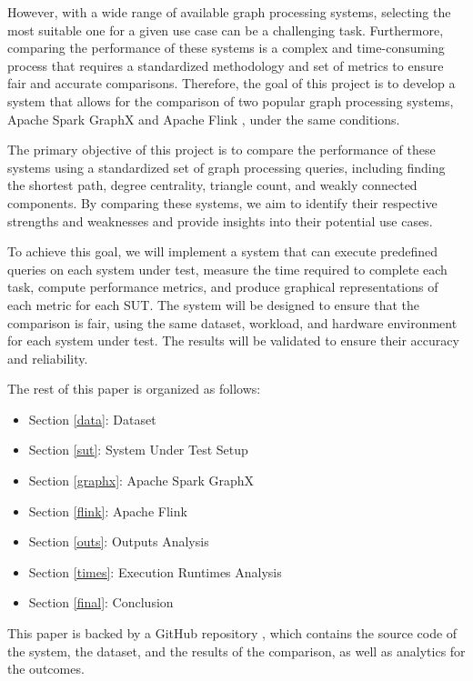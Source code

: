 \documentclass[conference]{IEEEtran}
\begin{document}
However, with a wide range of available graph processing systems, selecting the most suitable one for a given use case can be a challenging task. Furthermore, comparing the performance of these systems is a complex and time-consuming process that requires a standardized methodology and set of metrics to ensure fair and accurate comparisons. Therefore, the goal of this project is to develop a system that allows for the comparison of two popular graph processing systems, Apache Spark GraphX \cite{b1} and Apache Flink \cite{b2}, under the same conditions.

The primary objective of this project is to compare the performance of these systems using a standardized set of graph processing queries, including finding the shortest path, degree centrality, triangle count, and weakly connected components. By comparing these systems, we aim to identify their respective strengths and weaknesses and provide insights into their potential use cases.

To achieve this goal, we will implement a system that can execute predefined queries on each system under test, measure the time required to complete each task, compute performance metrics, and produce graphical representations of each metric for each SUT. The system will be designed to ensure that the comparison is fair, using the same dataset, workload, and hardware environment for each system under test. The results will be validated to ensure their accuracy and reliability.

The rest of this paper is organized as follows:

\begin{itemize}
\item Section \ref{data}: Dataset
\item Section \ref{sut}: System Under Test Setup
\item Section \ref{graphx}: Apache Spark GraphX
\item Section \ref{flink}: Apache Flink
\item Section \ref{outs}: Outputs Analysis
\item Section \ref{times}: Execution Runtimes Analysis
\item Section \ref{final}: Conclusion
\end{itemize}

This paper is backed by a GitHub repository \cite{b3} \cite{b4}, which contains the source code of the system, the dataset, and the results of the comparison, as well as analytics for the outcomes.
\end{document}

